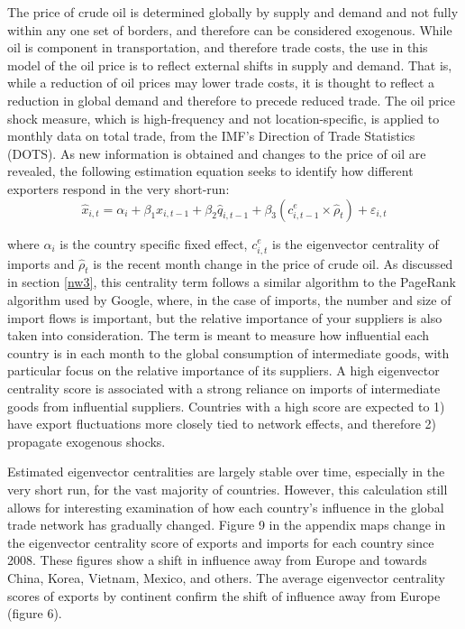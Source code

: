 \documentclass[10pt,letterpaper,pdftex]{article}
\begin{document}
The price of crude oil is determined globally by supply and demand and not fully within any one set of borders, and therefore can be considered exogenous. While oil is component in transportation, and therefore trade costs, the use in this model of the oil price is to reflect external shifts in supply and demand. That is, while a reduction of oil prices may lower trade costs, it is thought to reflect a reduction in global demand and therefore to precede reduced trade. The oil price shock measure, which is high-frequency and not location-specific, is applied to monthly data on total trade, from the IMF's Direction of Trade Statistics (DOTS). As new information is obtained and changes to the price of oil are revealed, the following estimation equation seeks to identify how different exporters respond in the very short-run:
\begin{equation}
\hat{x}_{i,t} = \alpha_{i} + \beta_1 x_{i,t-1} + \beta_2 \hat{q}_{i,t-1} + \beta_3 (c^e_{i,t-1} \times \hat{\rho}_{t}) + \varepsilon_{i,t}
\end{equation}

where $\alpha_{i}$ is the country specific fixed effect, $c^e_{i,t}$ is the eigenvector centrality of imports and $\hat{\rho}_{t}$ is the recent month change in the price of crude oil. As discussed in section \ref{nw3}, this centrality term follows a similar algorithm to the PageRank algorithm used by Google, where, in the case of imports, the number and size of import flows is important, but the relative importance of your suppliers is also taken into consideration. The term is meant to measure how influential each country is in each month to the global consumption of intermediate goods, with particular focus on the relative importance of its suppliers. A high eigenvector centrality score is associated with a strong reliance on imports of intermediate goods from influential suppliers. Countries with a high score are expected to 1) have export fluctuations more closely tied to network effects, and therefore 2) propagate exogenous shocks.

Estimated eigenvector centralities are largely stable over time, especially in the very short run, for the vast majority of countries. However, this calculation still allows for interesting examination of how each country's influence in the global trade network has gradually changed. Figure 9 in the appendix maps change in the eigenvector centrality score of exports and imports for each country since 2008. These figures show a shift in influence away from Europe and towards China, Korea, Vietnam, Mexico, and others. The average eigenvector centrality scores of exports by continent confirm the shift of influence away from Europe (figure 6).
\end{document}
